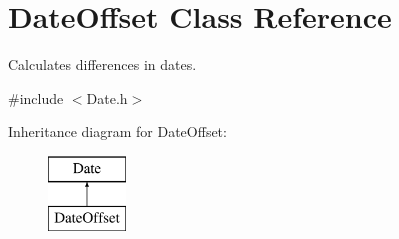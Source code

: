 \hypertarget{class_date_offset}{}\section{Date\+Offset Class Reference}
\label{class_date_offset}


Calculates differences in dates.  




{\ttfamily \#include $<$Date.\+h$>$}

Inheritance diagram for Date\+Offset\+:\begin{figure}[H]
\begin{center}
\leavevmode
\includegraphics[height=2.000000cm]{class_date_offset}
\end{center}
\end{figure}
